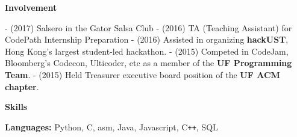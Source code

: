 \documentclass[letterpaper,10pt]{article}
\newcommand{\resheading}[1]{{\large \colorbox{mygrey}{\begin{minipage}{\textwidth}{\textbf{#1 \vphantom{p\^{E}}}}\end{minipage}}}}
\begin{document}
\resheading{Involvement}
\newline \newline
- (2017) Salsero in the Gator Salsa Club\newline
- (2016) TA (Teaching Assistant) for CodePath Internship Preparation \newline
- (2016) Assisted in organizing \textbf{hackUST}, Hong Kong's largest student-led hackathon. \newline
- (2015) Competed in CodeJam, Bloomberg's Codecon, Ulticoder, etc as a member of the \textbf{UF Programming Team}. \newline
- (2015) Held Treasurer executive board position of the \textbf{UF ACM chapter}.\newline

\resheading{Skills}
\newline\newline
\textbf{Languages:} \tabto{2.5cm} Python, C, asm, Java, Javascript, C{}\verb!++!, SQL \newline
\end{document}
